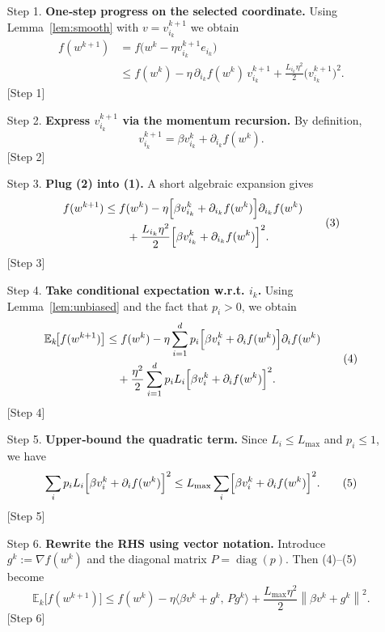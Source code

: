 \documentclass[11pt]{article}
\newcommand{\E}{\mathbb{E}}
\newcommand{\norm}[1]{\left\|#1\right\|}
\newcommand{\grad}{\nabla}
\begin{document}
\begin{enumerate}
\item[Step 1.] \textbf{One‑step progress on the selected coordinate.}  
Using Lemma~\ref{lem:smooth} with $v=v_{i_k}^{k+1}$ we obtain
\[
\begin{aligned}
f(w^{k+1}) 
&= f\!\bigl(w^{k}-\eta v_{i_k}^{k+1} e_{i_k}\bigr)\\
&\le f(w^{k})-\eta\,\partial_{i_k} f(w^{k})\, v_{i_k}^{k+1}
     +\frac{L_{i_k}\eta^{2}}{2}\bigl(v_{i_k}^{k+1}\bigr)^{2}.
\end{aligned}
\tag{1}
\] 
[Step 1]

\item[Step 2.] \textbf{Express $v_{i_k}^{k+1}$ via the momentum recursion.}  
By definition,
\[
v_{i_k}^{k+1}= \beta v_{i_k}^{k}+ \partial_{i_k} f(w^{k}).
\tag{2}
\] 
[Step 2]

\item[Step 3.] \textbf{Plug (2) into (1).}  
A short algebraic expansion gives
\[
\begin{aligned}
f(w^{k+1}) 
&\le f(w^{k})-\eta\Bigl[\beta v_{i_k}^{k}+ \partial_{i_k} f(w^{k})\Bigr]\partial_{i_k} f(w^{k})\\
&\qquad+\frac{L_{i_k}\eta^{2}}{2}\Bigl[\beta v_{i_k}^{k}+ \partial_{i_k} f(w^{k})\Bigr]^{2}.
\end{aligned}
\tag{3}
\] 
[Step 3]

\item[Step 4.] \textbf{Take conditional expectation w.r.t. $i_k$.}  
Using Lemma~\ref{lem:unbiased} and the fact that $p_i>0$, we obtain
\[
\begin{aligned}
\E_k\!\bigl[f(w^{k+1})\bigr] 
&\le f(w^{k})
-\eta\sum_{i=1}^{d}p_i\Bigl[\beta v_{i}^{k}+ \partial_{i} f(w^{k})\Bigr]\partial_{i} f(w^{k})\\
&\quad+\frac{\eta^{2}}{2}\sum_{i=1}^{d}p_i L_i\Bigl[\beta v_{i}^{k}+ \partial_{i} f(w^{k})\Bigr]^{2}.
\end{aligned}
\tag{4}
\] 
[Step 4]

\item[Step 5.] \textbf{Upper‑bound the quadratic term.}  
Since $L_i\le L_{\max}$ and $p_i\le 1$, we have
\[
\sum_{i}p_i L_i\Bigl[\beta v_{i}^{k}+ \partial_{i} f(w^{k})\Bigr]^{2}
\le L_{\max}\sum_{i}\Bigl[\beta v_{i}^{k}+ \partial_{i} f(w^{k})\Bigr]^{2}.
\tag{5}
\] 
[Step 5]

\item[Step 6.] \textbf{Rewrite the RHS using vector notation.}  
Introduce $g^{k}:=\grad f(w^{k})$ and the diagonal matrix $P=\operatorname{diag}(p)$.  Then (4)–(5) become
\[
\E_k\!\bigl[f(w^{k+1})\bigr]\le f(w^{k})
-\eta\bigl\langle \beta v^{k}+g^{k},\,P g^{k}\bigr\rangle
+\frac{L_{\max}\eta^{2}}{2}\norm{\beta v^{k}+g^{k}}^{2}.
\tag{6}
\] 
[Step 6]


\end{enumerate}
\end{document}
